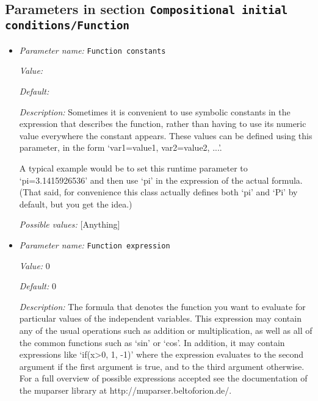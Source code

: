 \subsection{Parameters in section \tt Compositional initial conditions/Function}
\label{parameters:Compositional_20initial_20conditions/Function}

\begin{itemize}
\item {\it Parameter name:} {\tt Function constants}
\label{parameters:Compositional initial conditions/Function/Function constants}


{\it Value:} 


{\it Default:} 


{\it Description:} Sometimes it is convenient to use symbolic constants in the expression that describes the function, rather than having to use its numeric value everywhere the constant appears. These values can be defined using this parameter, in the form `var1=value1, var2=value2, ...'.

A typical example would be to set this runtime parameter to `pi=3.1415926536' and then use `pi' in the expression of the actual formula. (That said, for convenience this class actually defines both `pi' and `Pi' by default, but you get the idea.)


{\it Possible values:} [Anything]
\item {\it Parameter name:} {\tt Function expression}
\label{parameters:Compositional initial conditions/Function/Function expression}


{\it Value:} 0


{\it Default:} 0


{\it Description:} The formula that denotes the function you want to evaluate for particular values of the independent variables. This expression may contain any of the usual operations such as addition or multiplication, as well as all of the common functions such as `sin' or `cos'. In addition, it may contain expressions like `if(x>0, 1, -1)' where the expression evaluates to the second argument if the first argument is true, and to the third argument otherwise. For a full overview of possible expressions accepted see the documentation of the muparser library at http://muparser.beltoforion.de/.


\end{itemize}
